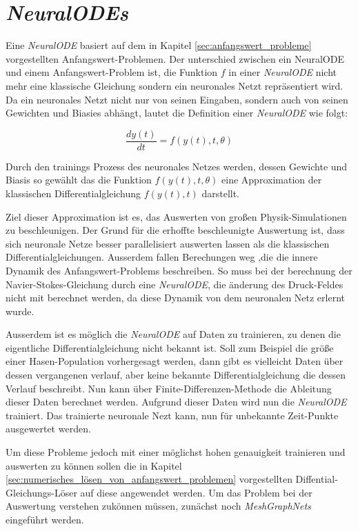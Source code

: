 
\section{\textit{NeuralODEs}} \label{sec:neural_ode}

Eine \textit{NeuralODE} \cite{neuralode} basiert auf dem in Kapitel \ref{sec:anfangswert_probleme} vorgestellten Anfangswert-Problemen.
Der unterschied zwischen ein NeuralODE und einem Anfangswert-Problem ist, 
die Funktion $f$ in einer \textit{NeuralODE} nicht mehr eine klassische Gleichung sondern ein 
neuronales Netzt repräsentiert wird.
Da ein neuronales Netzt nicht nur von seinen Eingaben, sondern auch von seinen Gewichten und Biasies abhängt,
lautet die Definition einer \textit{NeuralODE} wie folgt:

$$
\frac{d y(t)}{dt} = f(y(t), t, \theta)
$$

Durch den trainings Prozess des neuronales Netzes werden, dessen Gewichte und Biasis 
so gewählt das die Funktion $f(y(t), t, \theta)$ eine Approximation der klassischen Differentialgleichung 
$f(y(t), t)$ darstellt.

Ziel dieser Approximation ist es, das Auswerten von großen Physik-Simulationen zu beschleunigen.
Der Grund für die erhoffte beschleunigte Auswertung ist, dass sich neuronale Netze besser parallelisiert auswerten lassen
als die klassischen Differentialgleichungen.
Ausserdem fallen Berechungen weg ,die die innere Dynamik des Anfangswert-Problems beschreiben.
So muss bei der berechnung der Navier-Stokes-Gleichung durch eine \textit{NeuralODE}, die änderung des Druck-Feldes 
nicht mit berechnet werden, da diese Dynamik von dem neuronalen Netz erlernt wurde.

Ausserdem ist es möglich die \textit{NeuralODE} auf Daten zu trainieren, 
zu denen die eigentliche Differentialgleichung nicht bekannt ist.
Soll zum Beispiel die größe einer Hasen-Population vorhergesagt werden, dann gibt es vielleicht Daten über dessen 
vergangenen verlauf, aber keine bekannte Differentialgleichung die dessen Verlauf beschreibt.
Nun kann über Finite-Differenzen-Methode die Ableitung dieser Daten berechnet werden.
Aufgrund dieser Daten wird nun die \textit{NeuralODE} trainiert.
Das trainierte neuronale Nezt kann, nun für unbekannte Zeit-Punkte ausgewertet werden.

Um diese Probleme jedoch mit einer möglichst hohen genauigkeit trainieren und auswerten zu können
sollen die in Kapitel \ref{sec:numerisches_lösen_von_anfangswert_problemen} vorgestellten Diffential-Gleichungs-Löser auf diese angewendet werden.
Um das Problem bei der Auswertung verstehen zukönnen müssen, zunächst noch \textit{MeshGraphNets} eingeführt werden.

